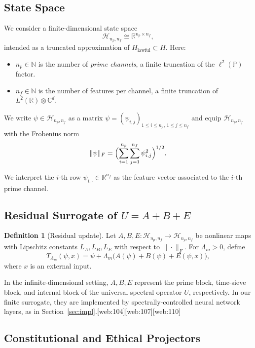 \documentclass[11pt]{article}
\theoremstyle{definition}
\newtheorem{definition}{Definition}
\theoremstyle{plain}
\begin{document}
\subsection{State Space}

We consider a finite-dimensional state space
\[
  \mathcal{H}_{n_p,n_f} \cong \mathbb{R}^{n_p \times n_f},
\]
intended as a truncated approximation of $H_{\mathrm{lawful}} \subset H$.
Here:
\begin{itemize}[leftmargin=*]
  \item $n_p \in \mathbb{N}$ is the number of \emph{prime channels}, a finite truncation of the $\ell^2(\mathbb{P})$ factor.
  \item $n_f \in \mathbb{N}$ is the number of features per channel, a finite truncation of $L^2(\mathbb{R}) \otimes \mathbb{C}^d$.
\end{itemize}

We write $\psi \in \mathcal{H}_{n_p,n_f}$ as a matrix $\psi = (\psi_{i,j})_{1 \le i \le n_p,\, 1 \le j \le n_f}$ and equip $\mathcal{H}_{n_p,n_f}$ with the Frobenius norm
\[
  \|\psi\|_F = \Bigl(\sum_{i=1}^{n_p}\sum_{j=1}^{n_f} \psi_{i,j}^2\Bigr)^{1/2}.
\]

We interpret the $i$-th row $\psi_{i,\cdot} \in \mathbb{R}^{n_f}$ as the feature vector associated to the $i$-th prime channel.

\subsection{Residual Surrogate of $U = A + B + E$}

\begin{definition}[Residual update]
Let $A,B,E : \mathcal{H}_{n_p,n_f} \to \mathcal{H}_{n_p,n_f}$ be nonlinear maps with Lipschitz constants $L_A,L_B,L_E$ with respect to $\|\cdot\|_F$.
For $\Lambda_m > 0$, define
\[
  T_{\Lambda_m}(\psi,x) = \psi + \Lambda_m\bigl(A(\psi) + B(\psi) + E(\psi,x)\bigr),
\]
where $x$ is an external input.
\end{definition}

In the infinite-dimensional setting, $A,B,E$ represent the prime block, time-sieve block, and internal block of the universal spectral operator $U$, respectively.
In our finite surrogate, they are implemented by spectrally-controlled neural network layers, as in Section~\ref{sec:impl}.[web:104][web:107][web:110]

\subsection{Constitutional and Ethical Projectors}
\end{document}
